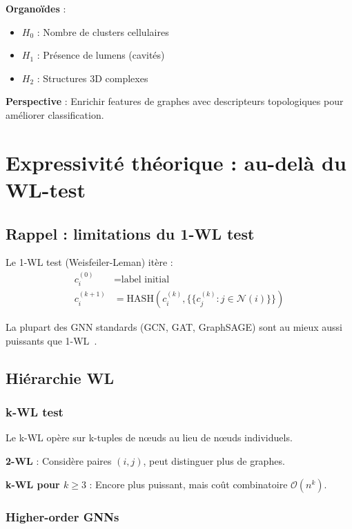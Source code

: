 \textbf{Organoïdes} : 
\begin{itemize}
    \item $H_0$ : Nombre de clusters cellulaires
    \item $H_1$ : Présence de lumens (cavités)
    \item $H_2$ : Structures 3D complexes
\end{itemize}

\textbf{Perspective} : Enrichir features de graphes avec descripteurs topologiques pour améliorer classification.

\section{Expressivité théorique : au-delà du WL-test}

\subsection{Rappel : limitations du 1-WL test}

Le 1-WL test (Weisfeiler-Leman) itère :
\begin{align*}
c_i^{(0)} &= \text{label initial} \\
c_i^{(k+1)} &= \text{HASH}\left(c_i^{(k)}, \{\!\!\{c_j^{(k)} : j \in \mathcal{N}(i)\}\!\!\}\right)
\end{align*}

La plupart des GNN standards (GCN, GAT, GraphSAGE) sont au mieux aussi puissants que 1-WL~\cite{Xu2019}.

\subsection{Hiérarchie WL}

\subsubsection{k-WL test}

Le k-WL opère sur k-tuples de nœuds au lieu de nœuds individuels.

\textbf{2-WL} : Considère paires $(i, j)$, peut distinguer plus de graphes.

\textbf{k-WL pour $k \geq 3$} : Encore plus puissant, mais coût combinatoire $\mathcal{O}(n^k)$.

\subsubsection{Higher-order GNNs}

